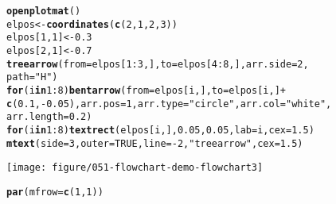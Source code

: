 \documentclass{article}\usepackage[]{graphicx}\usepackage[]{color}
\makeatletter
\def\maxwidth{ %
  \ifdim\Gin@nat@width>\linewidth
    \linewidth
  \else
    \Gin@nat@width
  \fi
}
\newcommand{\hlnum}[1]{\textcolor[rgb]{0.686,0.059,0.569}{#1}}%
\newcommand{\hlstr}[1]{\textcolor[rgb]{0.192,0.494,0.8}{#1}}%
\newcommand{\hlopt}[1]{\textcolor[rgb]{0,0,0}{#1}}%
\newcommand{\hlstd}[1]{\textcolor[rgb]{0.345,0.345,0.345}{#1}}%
\newcommand{\hlkwa}[1]{\textcolor[rgb]{0.161,0.373,0.58}{\textbf{#1}}}%
\newcommand{\hlkwb}[1]{\textcolor[rgb]{0.69,0.353,0.396}{#1}}%
\newcommand{\hlkwc}[1]{\textcolor[rgb]{0.333,0.667,0.333}{#1}}%
\newcommand{\hlkwd}[1]{\textcolor[rgb]{0.737,0.353,0.396}{\textbf{#1}}}%
\newenvironment{kframe}{%
 \def\at@end@of@kframe{}%
 \ifinner\ifhmode%
  \def\at@end@of@kframe{\end{minipage}}%
  \begin{minipage}{\columnwidth}%
 \fi\fi%
 \def\FrameCommand##1{\hskip\@totalleftmargin \hskip-\fboxsep
 \colorbox{shadecolor}{##1}\hskip-\fboxsep
     \hskip-\linewidth \hskip-\@totalleftmargin \hskip\columnwidth}%
 \MakeFramed {\advance\hsize-\width
   \@totalleftmargin\z@ \linewidth\hsize
   \@setminipage}}%
 {\par\unskip\endMakeFramed%
 \at@end@of@kframe}
\newenvironment{knitrout}{}{} %
\makeatother
\begin{document}
\begin{knitrout}
\begin{kframe}
\begin{alltt}
\hlkwd{openplotmat}\hlstd{()}
\hlstd{elpos} \hlkwb{<-} \hlkwd{coordinates}\hlstd{(}\hlkwd{c}\hlstd{(}\hlnum{2}\hlstd{,} \hlnum{1}\hlstd{,} \hlnum{2}\hlstd{,} \hlnum{3}\hlstd{))}
\hlstd{elpos[}\hlnum{1}\hlstd{,} \hlnum{1}\hlstd{]} \hlkwb{<-} \hlnum{0.3}
\hlstd{elpos[}\hlnum{2}\hlstd{,} \hlnum{1}\hlstd{]} \hlkwb{<-} \hlnum{0.7}
\hlkwd{treearrow}\hlstd{(}\hlkwc{from} \hlstd{= elpos[}\hlnum{1}\hlopt{:}\hlnum{3}\hlstd{, ],} \hlkwc{to} \hlstd{= elpos[}\hlnum{4}\hlopt{:}\hlnum{8}\hlstd{, ],} \hlkwc{arr.side} \hlstd{=} \hlnum{2}\hlstd{,}
    \hlkwc{path} \hlstd{=} \hlstr{"H"}\hlstd{)}
\hlkwa{for} \hlstd{(i} \hlkwa{in} \hlnum{1}\hlopt{:}\hlnum{8}\hlstd{)} \hlkwd{bentarrow}\hlstd{(}\hlkwc{from} \hlstd{= elpos[i, ],} \hlkwc{to} \hlstd{= elpos[i, ]} \hlopt{+}
    \hlkwd{c}\hlstd{(}\hlnum{0.1}\hlstd{,} \hlopt{-}\hlnum{0.05}\hlstd{),} \hlkwc{arr.pos} \hlstd{=} \hlnum{1}\hlstd{,} \hlkwc{arr.type} \hlstd{=} \hlstr{"circle"}\hlstd{,} \hlkwc{arr.col} \hlstd{=} \hlstr{"white"}\hlstd{,}
    \hlkwc{arr.length} \hlstd{=} \hlnum{0.2}\hlstd{)}
\hlkwa{for} \hlstd{(i} \hlkwa{in} \hlnum{1}\hlopt{:}\hlnum{8}\hlstd{)} \hlkwd{textrect}\hlstd{(elpos[i, ],} \hlnum{0.05}\hlstd{,} \hlnum{0.05}\hlstd{,} \hlkwc{lab} \hlstd{= i,} \hlkwc{cex} \hlstd{=} \hlnum{1.5}\hlstd{)}
\hlkwd{mtext}\hlstd{(}\hlkwc{side} \hlstd{=} \hlnum{3}\hlstd{,} \hlkwc{outer} \hlstd{=} \hlnum{TRUE}\hlstd{,} \hlkwc{line} \hlstd{=} \hlopt{-}\hlnum{2}\hlstd{,} \hlstr{"treearrow"}\hlstd{,} \hlkwc{cex} \hlstd{=} \hlnum{1.5}\hlstd{)}
\end{alltt}
\end{kframe}
\texttt{[image: figure/051-flowchart-demo-flowchart3]} 
\begin{kframe}\begin{alltt}
\hlkwd{par}\hlstd{(}\hlkwc{mfrow} \hlstd{=} \hlkwd{c}\hlstd{(}\hlnum{1}\hlstd{,} \hlnum{1}\hlstd{))}


\end{alltt}
\end{kframe}
\end{knitrout}
\end{document}
